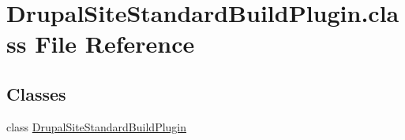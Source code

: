 \hypertarget{DrupalSiteStandardBuildPlugin_8class}{\section{Drupal\-Site\-Standard\-Build\-Plugin.\-class File Reference}
\label{DrupalSiteStandardBuildPlugin_8class}
}
\subsection*{Classes}
\begin{DoxyCompactItemize}
\item 
class \hyperlink{classDrupalSiteStandardBuildPlugin}{Drupal\-Site\-Standard\-Build\-Plugin}
\end{DoxyCompactItemize}
